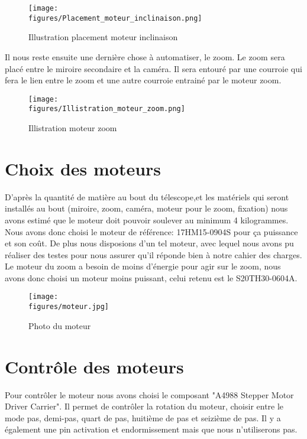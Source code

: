 \begin{figure}[H]
    \centering
	\texttt{[image: \\figures/Placement\_moteur\_inclinaison.png]}
    \decoRule
    \caption[
    Illustration placement moteur inclinaison]{
    Illustration placement moteur inclinaison}
    \label{fig:Illustration placement moteur inclinaison}
    \end{figure}
    
Il nous reste ensuite une dernière chose à automatiser, le zoom. Le zoom sera placé entre le miroire secondaire et la caméra. Il sera entouré par une courroie qui fera le lien entre le zoom et une autre courroie entrainé par le moteur zoom.

\begin{figure}[H]
    \centering
	\texttt{[image: \\figures/Illistration\_moteur\_zoom.png]}
    \decoRule
    \caption[
    Illistration moteur zoom]{
    Illistration moteur zoom}
    \label{fig:Illistration moteur zoom}
    \end{figure}

\section{Choix des moteurs}

D'après la quantité de matière au bout du télescope,et les matériels qui seront installés au bout (miroire, zoom, caméra, moteur pour le zoom, fixation) nous avons estimé que le moteur doit pouvoir soulever au minimum 4 kilogrammes.
Nous avons donc choisi le moteur de référence: 17HM15-0904S pour ça puissance et son coût. De plus nous disposions d'un tel moteur, avec lequel nous avons pu réaliser des testes pour nous assurer qu'il réponde bien à notre cahier des charges.
Le moteur du zoom a besoin de moins d'énergie pour agir sur le zoom, nous avons donc choisi un moteur moins puissant, celui retenu est le S20TH30-0604A.

\begin{figure}[H]
    \centering
	\texttt{[image: \\figures/moteur.jpg]}
    \decoRule
    \caption[
    Photo du moteur]{
    Photo du moteur}
    \label{fig:Photo du moteur}
    \end{figure}
    
\section{Contrôle des moteurs}

Pour contrôler le moteur nous avons choisi le composant "A4988 Stepper Motor Driver Carrier". Il permet de contrôler la rotation du moteur, choisir entre le mode pas, demi-pas, quart de pas, huitième de pas et seizième de pas. Il y a également une pin activation et endormissement mais que nous n'utiliserons pas.

